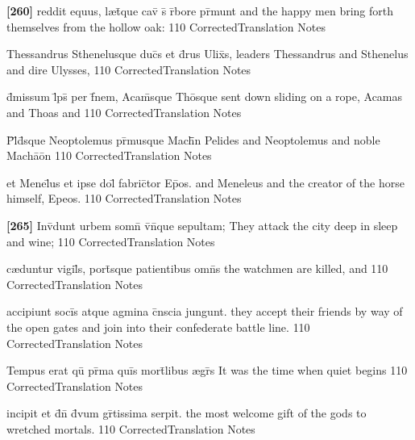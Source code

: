 \latline
  {\textbf{[260]} reddit equus, l{\ae}t\={\macron {\i}}que cav\={} s\={} r\={}bore pr\={}munt}
  { and the happy men bring forth themselves from the hollow oak: }
  {110}
  { CorrectedTranslation }
  { Notes }


\latline
  {Thessandrus Sthenelusque duc\={}s et d\={\macron {\i}}rus Ulix\={}s,}
  { leaders Thessandrus and Sthenelus and dire Ulysses, }
  {110}
  { CorrectedTranslation }
  { Notes }


\latline
  {d\={}missum l\={}ps\={\macron {\i}} per f\={}nem, Acam\={}sque Tho\={}sque}
  { sent down sliding on a rope, Acamas and Thoas and  }
  {110}
  { CorrectedTranslation }
  { Notes }


\latline
  {P\={}l\={\macron {\i}}d\={}sque Neoptolemus pr\={\macron {\i}}musque Mach\={}\={}n}
  { Pelides and Neoptolemus and noble Mach\={a}\={o}n }
  {110}
  { CorrectedTranslation }
  { Notes }


\latline
  {et Menel\={}us et ipse dol\={\macron {\i}} fabric\={}tor Ep\={}os.}
  { and Meneleus and the creator of the horse himself, Epeos. }
  {110}
  { CorrectedTranslation }
  { Notes }


\latline
  {\textbf{[265]} Inv\={}dunt urbem somn\={} v\={\macron {\i}}n\={}que sepultam;}
  { They attack the city deep in sleep and wine;  }
  {110}
  { CorrectedTranslation }
  { Notes }


\latline
  {c{\ae}duntur vigil\={}s, port\={\macron {\i}}sque patientibus omn\={\macron {\i}}s}
  { the watchmen are killed, and }
  {110}
  { CorrectedTranslation }
  { Notes }


\latline
  {accipiunt soci\={}s atque agmina c\={}nscia jungunt.}
  { they accept their friends by way of the open gates and join into their confederate battle line. }
  {110}
  { CorrectedTranslation }
  { Notes }


\latline
  {Tempus erat qu\={} pr\={\macron {\i}}ma qui\={}s mort\={}libus {\ae}gr\={\macron {\i}}s}
  { It was the time when quiet begins  }
  {110}
  { CorrectedTranslation }
  { Notes }


\latline
  {incipit et d\={}n\={} d\={\macron {\i}}vum gr\={}tissima serpit.}
  { the most welcome gift of the gods to wretched mortals. }
  {110}
  { CorrectedTranslation }
  { Notes }


